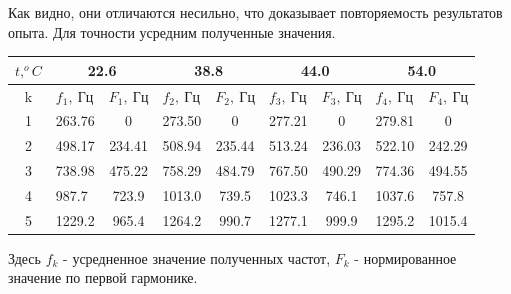 \documentclass[12pt,a4paper]{article}
\begin{document}
\begin{enumerate}
Как видно, они отличаются несильно, что доказывает повторяемость результатов опыта. Для точности усредним полученные значения.

\begin{table}[htp]
\begin{center}
\begin{tabular}{|c|cc|cc|cc|cc|}
\hline
$t,^o C$ & \multicolumn{2}{c|}{22.6}                    & \multicolumn{2}{c|}{38.8}                    & \multicolumn{2}{c|}{44.0}                    & \multicolumn{2}{c|}{54.0}                    \\ \hline
k        & \multicolumn{1}{l|}{$f_1,\ Гц$} & $F_1,\ Гц$ & \multicolumn{1}{l|}{$f_2,\ Гц$} & $F_2,\ Гц$ & \multicolumn{1}{l|}{$f_3,\ Гц$} & $F_3,\ Гц$ & \multicolumn{1}{l|}{$f_4,\ Гц$} & $F_4,\ Гц$ \\ \hline
1        & \multicolumn{1}{l|}{263.76}     & 0          & \multicolumn{1}{l|}{273.50}     & 0          & \multicolumn{1}{l|}{277.21}     & 0          & \multicolumn{1}{l|}{279.81}     & 0          \\ \hline
2        & \multicolumn{1}{l|}{498.17}     & 234.41     & \multicolumn{1}{l|}{508.94}     & 235.44     & \multicolumn{1}{l|}{513.24}     & 236.03     & \multicolumn{1}{l|}{522.10}     & 242.29     \\ \hline
3        & \multicolumn{1}{l|}{738.98}     & 475.22     & \multicolumn{1}{l|}{758.29}     & 484.79     & \multicolumn{1}{l|}{767.50}     & 490.29     & \multicolumn{1}{l|}{774.36}     & 494.55     \\ \hline
4        & \multicolumn{1}{l|}{987.7}      & 723.9      & \multicolumn{1}{l|}{1013.0}     & 739.5      & \multicolumn{1}{l|}{1023.3}     & 746.1      & \multicolumn{1}{l|}{1037.6}     & 757.8      \\ \hline
5        & \multicolumn{1}{l|}{1229.2}     & 965.4      & \multicolumn{1}{l|}{1264.2}     & 990.7      & \multicolumn{1}{l|}{1277.1}     & 999.9      & \multicolumn{1}{l|}{1295.2}     & 1015.4     \\ \hline
\end{tabular}
\end{center}
\end{table}

Здесь $f_k$ - усредненное значение полученных частот, $F_k$ - нормированное значение по первой гармонике.


\end{enumerate}
\end{document}
